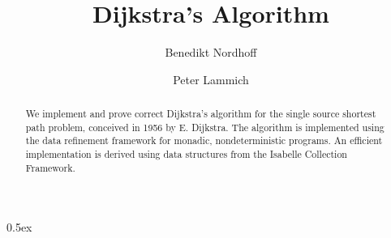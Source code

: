 \documentclass[11pt,a4paper]{article}
\begin{document}
\title{Dijkstra's Algorithm} 


\author{Benedikt Nordhoff \and Peter Lammich}
\maketitle

\begin{abstract}
  We implement and prove correct Dijkstra's algorithm for the single source 
  shortest path problem, conceived in
  1956 by E. Dijkstra. The algorithm is implemented using the data refinement
  framework for monadic, nondeterministic programs. An efficient 
  implementation is derived using data structures from the 
  Isabelle Collection Framework.
\end{abstract}

\tableofcontents

\clearpage

\parindent 0pt\parskip 0.5ex





\end{document}
